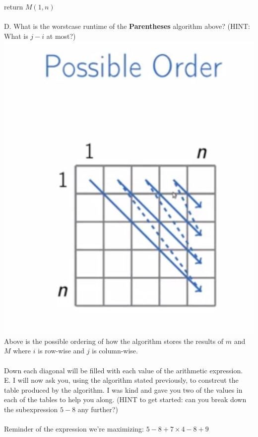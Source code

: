 \documentclass[12pt]{article}
\begin{document}
return $M(1,n)$\\\\
D. What is the worstcase runtime of the \textbf{Parentheses} algorithm above? (HINT: What is $j-i$ at most?)
\newpage
\noindent\includegraphics[scale = .3]{order.jpg}\\
Above is the possible ordering of how the algorithm 
stores the results of $m$ and $M$ where $i$ is 
row-wise and $j$ is column-wise.\\\\
Down each diagonal will be filled with each value of the arithmetic expression.\\
E. I will now ask you, using the algorithm stated previously, 
to constrcut the table produced by the algorithm. I was kind and gave you
two of the values in each of the tables to help you along. (HINT to get started:
can you break down the subexpression $5-8$ any further?)\\\\
Reminder of the expression we're maximizing:
$5-8+7 \times 4-8+9$
\FloatBarrier
\end{document}
